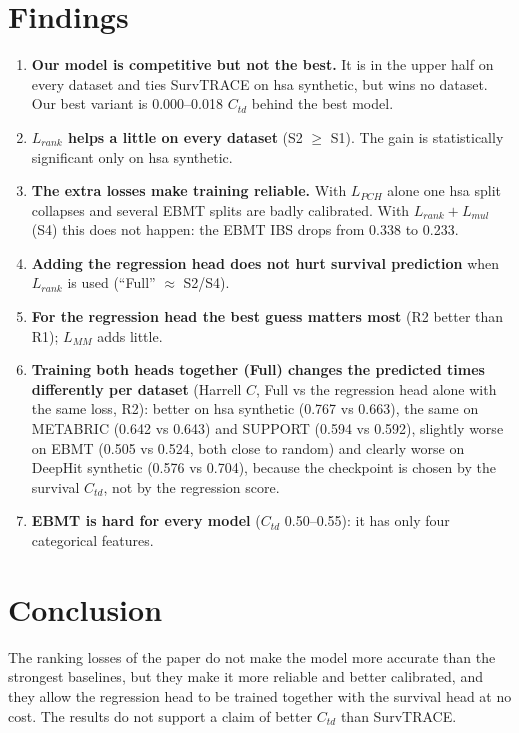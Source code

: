 \documentclass[11pt]{article}
\begin{document}
\section{Findings}
\begin{enumerate}
  \item \textbf{Our model is competitive but not the best.} It is in the upper half on every
        dataset and ties SurvTRACE on hsa synthetic, but wins no dataset. Our best variant is
        0.000--0.018 $C_{td}$ behind the best model.
  \item \textbf{$L_{rank}$ helps a little on every dataset} (S2 $\geq$ S1). The gain is
        statistically significant only on hsa synthetic.
  \item \textbf{The extra losses make training reliable.} With $L_{PCH}$ alone one hsa split
        collapses and several EBMT splits are badly calibrated. With $L_{rank}+L_{mul}$ (S4) this
        does not happen: the EBMT IBS drops from 0.338 to 0.233.
  \item \textbf{Adding the regression head does not hurt survival prediction} when $L_{rank}$ is
        used (``Full'' $\approx$ S2/S4).
  \item \textbf{For the regression head the best guess matters most} (R2 better than R1);
        $L_{MM}$ adds little.
  \item \textbf{Training both heads together (Full) changes the predicted times differently per dataset}
        (Harrell $C$, Full vs the regression head alone with the same loss, R2):
        better on hsa synthetic (0.767 vs 0.663), the same on METABRIC (0.642 vs 0.643) and SUPPORT
        (0.594 vs 0.592), slightly worse on EBMT (0.505 vs 0.524, both close to random) and clearly
        worse on DeepHit synthetic (0.576 vs 0.704), because the checkpoint is chosen by the survival
        $C_{td}$, not by the regression score.
  \item \textbf{EBMT is hard for every model} ($C_{td}$ 0.50--0.55): it has only four categorical
        features.
\end{enumerate}

\section{Conclusion}
The ranking losses of the paper do not make the model more accurate than the strongest baselines,
but they make it more reliable and better calibrated, and they allow the regression head to be
trained together with the survival head at no cost. The results do not support a claim of better
$C_{td}$ than SurvTRACE.
\end{document}
